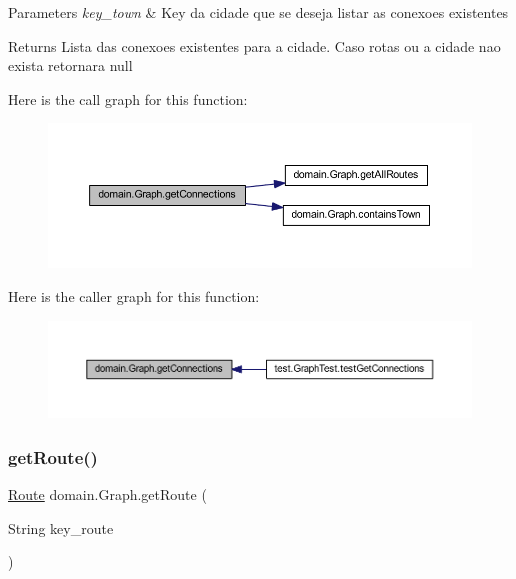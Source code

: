 \begin{DoxyParams}{Parameters}
{\em key\+\_\+town} & Key da cidade que se deseja listar as conexoes existentes \\
\hline
\end{DoxyParams}
\begin{DoxyReturn}{Returns}
Lista das conexoes existentes para a cidade. Caso rotas ou a cidade nao exista retornara null 
\end{DoxyReturn}
Here is the call graph for this function\+:\nopagebreak
\begin{figure}[H]
\begin{center}
\leavevmode
\includegraphics[width=350pt]{classdomain_1_1_graph_adab0f0e6ae7af913998f537aa0fe62f1_cgraph}
\end{center}
\end{figure}
Here is the caller graph for this function\+:\nopagebreak
\begin{figure}[H]
\begin{center}
\leavevmode
\includegraphics[width=350pt]{classdomain_1_1_graph_adab0f0e6ae7af913998f537aa0fe62f1_icgraph}
\end{center}
\end{figure}
\mbox{\label{classdomain_1_1_graph_a3499aec1dfba7e73b34007cb4271e192}} 
\subsubsection{\texorpdfstring{get\+Route()}{getRoute()}}
{\footnotesize\ttfamily \hyperlink{classdomain_1_1_route}{Route} domain.\+Graph.\+get\+Route (\begin{DoxyParamCaption}\item[{String}]{key\+\_\+route }\end{DoxyParamCaption})}


